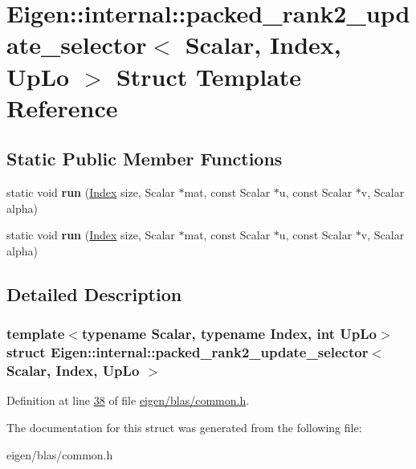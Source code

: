 \hypertarget{struct_eigen_1_1internal_1_1packed__rank2__update__selector}{}\section{Eigen\+:\+:internal\+:\+:packed\+\_\+rank2\+\_\+update\+\_\+selector$<$ Scalar, Index, Up\+Lo $>$ Struct Template Reference}
\label{struct_eigen_1_1internal_1_1packed__rank2__update__selector}
\subsection*{Static Public Member Functions}
\begin{DoxyCompactItemize}
\item 
\mbox{\label{struct_eigen_1_1internal_1_1packed__rank2__update__selector_a535a6404d20dad0b38895027dc70aae2}} 
static void {\bfseries run} (\hyperlink{namespace_eigen_a62e77e0933482dafde8fe197d9a2cfde}{Index} size, Scalar $\ast$mat, const Scalar $\ast$u, const Scalar $\ast$v, Scalar alpha)
\item 
\mbox{\label{struct_eigen_1_1internal_1_1packed__rank2__update__selector_a535a6404d20dad0b38895027dc70aae2}} 
static void {\bfseries run} (\hyperlink{namespace_eigen_a62e77e0933482dafde8fe197d9a2cfde}{Index} size, Scalar $\ast$mat, const Scalar $\ast$u, const Scalar $\ast$v, Scalar alpha)
\end{DoxyCompactItemize}


\subsection{Detailed Description}
\subsubsection*{template$<$typename Scalar, typename Index, int Up\+Lo$>$\newline
struct Eigen\+::internal\+::packed\+\_\+rank2\+\_\+update\+\_\+selector$<$ Scalar, Index, Up\+Lo $>$}



Definition at line \hyperlink{eigen_2blas_2common_8h_source_l00038}{38} of file \hyperlink{eigen_2blas_2common_8h_source}{eigen/blas/common.\+h}.



The documentation for this struct was generated from the following file\+:\begin{DoxyCompactItemize}
\item 
eigen/blas/common.\+h\end{DoxyCompactItemize}
